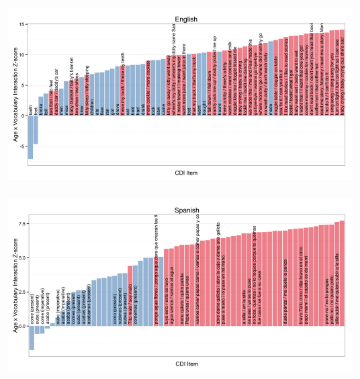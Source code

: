 \documentclass[10pt,letterpaper]{article}
\begin{document}
\begin{figure}[!tbh]
\centering

\begin{subfigure}[b]{0.45\textwidth}
\includegraphics[width=\textwidth]{plots/english_interactions}
\end{subfigure}
\begin{subfigure}[b]{0.45\textwidth}
\includegraphics[width=\textwidth]{plots/spanish_interactions}
\end{subfigure}


\end{figure}
\end{document}
